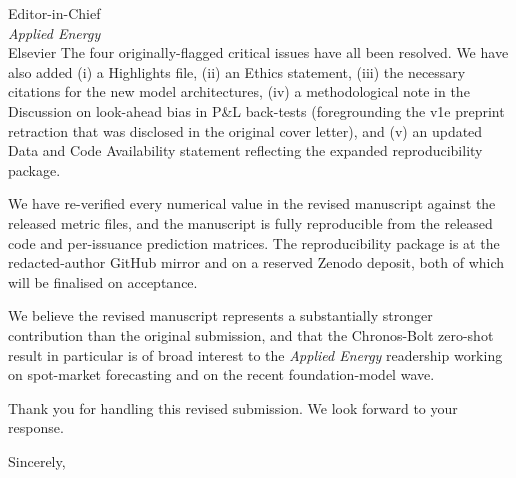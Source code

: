 \documentclass[11pt,a4paper]{letter}
\begin{document}
\begin{letter}{Editor-in-Chief \\ \emph{Applied Energy} \\ Elsevier}
The four originally-flagged critical issues have all been resolved. We have also added (i) a Highlights file, (ii) an Ethics statement, (iii) the necessary citations for the new model architectures, (iv) a methodological note in the Discussion on look-ahead bias in P\&L back-tests (foregrounding the v1e preprint retraction that was disclosed in the original cover letter), and (v) an updated Data and Code Availability statement reflecting the expanded reproducibility package.

We have re-verified every numerical value in the revised manuscript against the released metric files, and the manuscript is fully reproducible from the released code and per-issuance prediction matrices. The reproducibility package is at the redacted-author GitHub mirror and on a reserved Zenodo deposit, both of which will be finalised on acceptance.

We believe the revised manuscript represents a substantially stronger contribution than the original submission, and that the Chronos-Bolt zero-shot result in particular is of broad interest to the \emph{Applied Energy} readership working on spot-market forecasting and on the recent foundation-model wave.

Thank you for handling this revised submission. We look forward to your response.

\closing{Sincerely,}

\end{letter}
\end{document}
